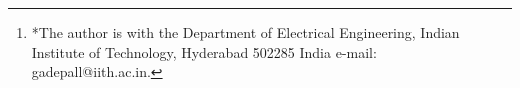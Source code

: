 \documentclass[journal,12pt,twocolumn]{IEEEtran}
\begin{document}
\author{Tanmay Agarwal and G V V Sharma$^{*}$%
\thanks{*The author is with the Department
of Electrical Engineering, Indian Institute of Technology, Hyderabad
502285 India e-mail:  gadepall@iith.ac.in.} 
}
% 
%



% 







\maketitle
\end{document}
